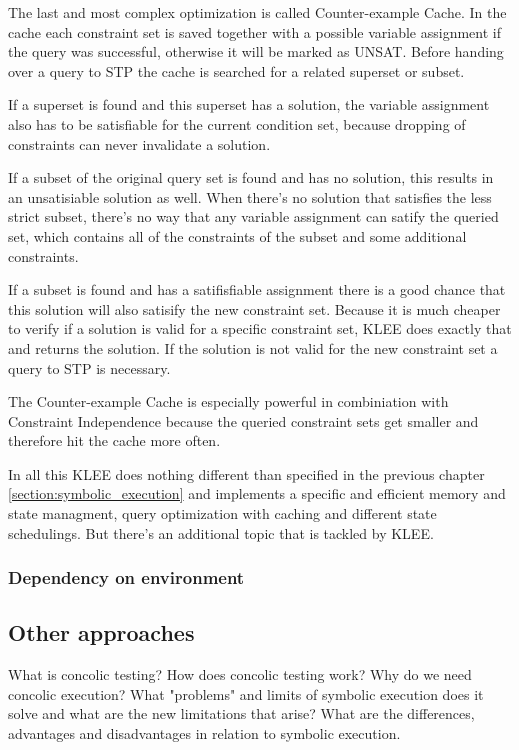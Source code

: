 The last and most complex optimization is called Counter-example Cache. In the cache each constraint set is saved together with a possible variable assignment if the query was successful, otherwise it will be marked as UNSAT. Before handing over a query to STP the cache is searched for a related superset or subset.

If a superset is found and this superset has a solution, the variable assignment also has to be satisfiable for the current condition set, because dropping of constraints can never invalidate a solution.

If a subset of the original query set is found and has no solution, this results in an unsatisiable solution as well. When there's no solution that satisfies the less strict subset, there's no way that any variable assignment can satify the queried set, which contains all of the constraints of the subset and some additional constraints.

If a subset is found and has a satifisfiable assignment there is a good chance that this solution will also satisify the new constraint set. Because it is much cheaper to verify if a solution is valid for a specific constraint set, KLEE does exactly that and returns the solution. If the solution is not valid for the new constraint set a query to STP is necessary.

The Counter-example Cache is especially powerful in combiniation with Constraint Independence because the queried constraint sets get smaller and therefore hit the cache more often.

In all this KLEE does nothing different than specified in the previous chapter \ref{section:symbolic_execution} and implements a specific and efficient memory and state managment, query optimization with caching and different state schedulings. But there's an additional topic that is tackled by KLEE.
\subsubsection{Dependency on environment}
 


\subsection{Other approaches}
\cite{SurveySymExec-CSUR18}

What is concolic testing? How does concolic testing work? Why do we need concolic execution? What "problems" and limits of symbolic execution does it solve and what are the new limitations that arise?
What are the differences, advantages and disadvantages in relation to symbolic execution.
\cite{Cadar:2006:EAG:1180405.1180445}
\cite{Cadar:2008:KUA:1855741.1855756}
\cite{Cadar:2013:SES:2408776.2408795}
\cite{Godefroid:2005:DDA:1064978.1065036}
\cite{Godefroid:2012:SWF:2090147.2094081}